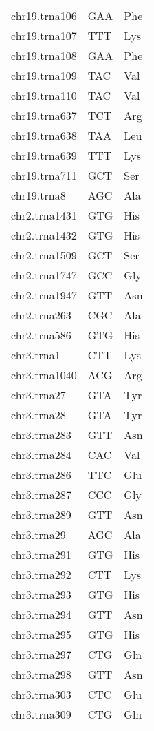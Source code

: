 \begin{longtable}{@{}l>{\collectcell\anticodon}l<{\endcollectcell}l@{}}
    chr19.trna106 & GAA & Phe \\
    chr19.trna107 & TTT & Lys \\
    chr19.trna108 & GAA & Phe \\
    chr19.trna109 & TAC & Val \\
    chr19.trna110 & TAC & Val \\
    chr19.trna637 & TCT & Arg \\
    chr19.trna638 & TAA & Leu \\
    chr19.trna639 & TTT & Lys \\
    chr19.trna711 & GCT & Ser \\
    chr19.trna8 & AGC & Ala \\
    chr2.trna1431 & GTG & His \\
    chr2.trna1432 & GTG & His \\
    chr2.trna1509 & GCT & Ser \\
    chr2.trna1747 & GCC & Gly \\
    chr2.trna1947 & GTT & Asn \\
    chr2.trna263 & CGC & Ala \\
    chr2.trna586 & GTG & His \\
    chr3.trna1 & CTT & Lys \\
    chr3.trna1040 & ACG & Arg \\
    chr3.trna27 & GTA & Tyr \\
    chr3.trna28 & GTA & Tyr \\
    chr3.trna283 & GTT & Asn \\
    chr3.trna284 & CAC & Val \\
    chr3.trna286 & TTC & Glu \\
    chr3.trna287 & CCC & Gly \\
    chr3.trna289 & GTT & Asn \\
    chr3.trna29 & AGC & Ala \\
    chr3.trna291 & GTG & His \\
    chr3.trna292 & CTT & Lys \\
    chr3.trna293 & GTG & His \\
    chr3.trna294 & GTT & Asn \\
    chr3.trna295 & GTG & His \\
    chr3.trna297 & CTG & Gln \\
    chr3.trna298 & GTT & Asn \\
    chr3.trna303 & CTC & Glu \\
    chr3.trna309 & CTG & Gln \\

\end{longtable}

